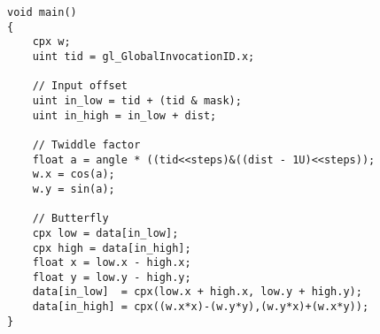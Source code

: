 \begin{lstlisting}
void main()
{
    cpx w;
    uint tid = gl_GlobalInvocationID.x;
	
    // Input offset
    uint in_low = tid + (tid & mask);
    uint in_high = in_low + dist;    
    
    // Twiddle factor
    float a = angle * ((tid<<steps)&((dist - 1U)<<steps));    
    w.x = cos(a);
    w.y = sin(a);
    
    // Butterfly
    cpx low = data[in_low];
    cpx high = data[in_high];
    float x = low.x - high.x;
    float y = low.y - high.y;
    data[in_low]  = cpx(low.x + high.x, low.y + high.y);
    data[in_high] = cpx((w.x*x)-(w.y*y),(w.y*x)+(w.x*y));
}
\end{lstlisting}